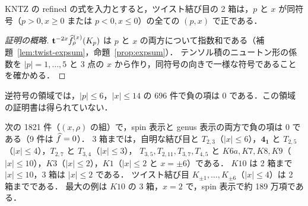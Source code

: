 \begin{theorem}[計算機援用]\label{thm:twist-x}
KNTZ の refined の式を入力とすると，ツイスト結び目の 2 箱は，$p$ と $x$ が同符号（$p>0,x\ge0$ または $p<0,x\le0$）の全ての $(p,x)$ で正である．
\end{theorem}
\begin{proof}[証明の概略]
$\mathbf{t}^{-2x}\widehat{f}^{(x)}_\rho(K_p)$ は $p$ と $x$ の両方について指数和である（補題~\ref{lem:twist-expsum}，命題~\ref{prop:expsum}）．
テンソル積のニュートン形の係数を $|p|=1,\dots,5$ と 3 点の $x$ から作り，同符号の向きで一様な符号であることを確かめる．
\end{proof}

\begin{compresult}
逆符号の領域では，$|p|\le6$，$|x|\le14$ の 696 件で負の項は 0 である．この領域の証明書は得られていない．
\end{compresult}

\begin{compresult}\label{cr:framing-batch}
次の 1821 件（$(x,\rho)$ の組）で，spin 表示と genus 表示の両方で負の項は 0 である（9 件は $\widehat{f}=0$）．
3 箱までは，自明な結び目と $T_{2,3}$（$|x|\le6$），$\mathbf{4_1}$ と $T_{2,5}$（$|x|\le4$），$T_{2,7}$ と $T_{3,4}$（$|x|\le3$），
$T_{3,5},T_{2,11},T_{3,7},T_{4,5}$ と $K6a,K7,K8,K9$（$|x|\le10$），$K3$（$|x|\le2$），$K1$（$|x|\le2$ と $x=\pm6$）である．
$K10$ は 2 箱まで $|x|\le10$，3 箱は $|x|\le2$ である．
ツイスト結び目 $K_{\pm1},\dots,K_{\pm6}$（$|x|\le4$）は 2 箱までである．
最大の例は $K10$ の 3 箱，$x=2$ で，spin 表示で約 189 万項である．
\end{compresult}

\begin{table}[h]
\centering
\caption{framing を振った判定．$|\rho|=1,2,3$ の列は調べた framing $x$ の範囲，件数は判定した $(x,\rho)$ の組の数（「各」は 1 結び目あたり．$K10$ の 3 箱の $x=0$ は表~\ref{tab:three} の判定で，件数に含めない），負（spin/genus）は spin 表示と genus 表示の負の項の数の合計（全体の符号は良い方）．自明な結び目の 9 件は $\wh f=0$．}\label{tab:framing}
\resizebox{\textwidth}{!}{}
\end{table}
